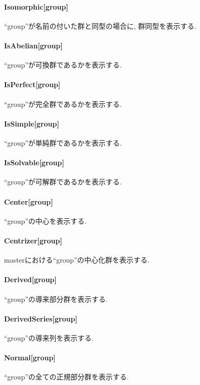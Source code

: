 \documentclass[11pt, a4paper]{jsarticle}
\begin{document}
\paragraph{Isomorphic[group]}
``group''が名前の付いた群と同型の場合に, 群同型を表示する.

\paragraph{IsAbelian[group]}
``group''が可換群であるかを表示する.

\paragraph{IsPerfect[group]}
``group''が完全群であるかを表示する.

\paragraph{IsSimple[group]}
``group''が単純群であるかを表示する.

\paragraph{IsSolvable[group]}
``group''が可解群であるかを表示する.

\paragraph{Center[group]}
``group''の中心を表示する.

\paragraph{Centrizer[group]}
masterにおける``group''の中心化群を表示する.

\paragraph{Derived[group]}
``group''の導来部分群を表示する.

\paragraph{DerivedSeries[group]}
``group''の導来列を表示する.

\paragraph{Normal[group]}
``group''の全ての正規部分群を表示する.
\end{document}
